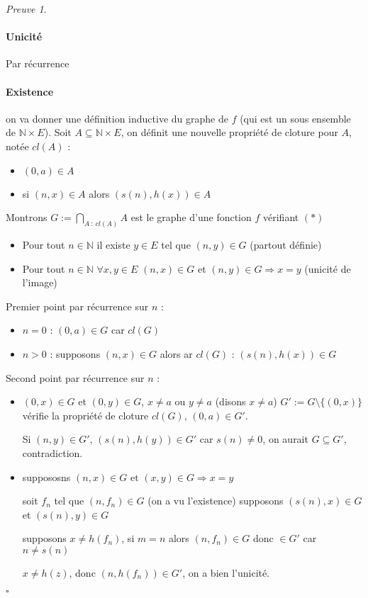 \documentclass[]{article}
\theoremstyle{remark}
\newtheorem{myproof}{Preuve}
\theoremstyle{definition}
\newcommand{\cqfd}{
	\hfill$\square$
}
\begin{document}
\begin{myproof}
	\leavevmode
	\paragraph{Unicité}
	Par récurrence \checkmark
	\paragraph{Existence}
	on va donner une définition inductive du graphe de $f$ (qui est un sous ensemble de $\mathbb{N} \times E$).
	Soit $A \subseteq \mathbb{N} \times E$, on définit une nouvelle propriété de cloture pour $A$, notée $cl(A)$ :
	\begin{itemize}
		\item $(0, a) \in A$
		\item si $(n, x) \in A$ alors $(s(n), h(x)) \in A$
	\end{itemize}
	
	Montrons $G := \bigcap_{A ~ : ~ cl(A)} A$ est le graphe d'une fonction $f$ vérifiant $(*)$
	
	\begin{itemize}
		\item Pour tout $n \in \mathbb{N}$ il existe $y \in E$ tel que $(n, y) \in G$ (partout définie)
		\item Pour tout $n \in \mathbb{N}$ $\forall x, y \in E$ $(n, x) \in G$ et $(n ,y) \in G \Longrightarrow x = y$ (unicité de l'image)
	\end{itemize}
	
	Premier point par récurrence sur $n$ :
	\begin{itemize}
		\item $n=0$ : $(0, a) \in G$ car $cl(G)$
		\item $n > 0$ : supposons $(n, x) \in G$ alors ar $cl(G)$ : $(s(n), h(x)) \in G$
	\end{itemize}
	
	Second point par récurrence sur $n$ :
	\begin{itemize}
		\item $(0, x) \in G$ et $(0, y) \in G$, $x \neq a$ ou $y \neq a$ (disons $x \neq a$)
		$G' := G \setminus \{(0, x)\}$ vérifie la propriété de cloture $cl(G)$, $(0, a) \in G'$.
		
		Si $(n, y) \in G'$, $(s(n), h(y)) \in G'$ car $s(n) \neq 0$, on aurait $G \subseteq G'$, contradiction.
		
		\item suppososns $(n, x) \in G \text{ et } (x, y) \in G \Longrightarrow x = y$
		
		soit $f_n$ tel que $(n, f_n) \in G$ (on a vu l'existence) supposons $(s(n), x) \in G$ et $(s(n), y) \in G$
		
		supposons $x \neq h(f_n)$, si $m = n$ alors $(n, f_n) \in G$ donc $\in G'$ car $n \neq s(n)$
		
		$x \neq h(z)$, donc $(n, h(f_n)) \in G'$, on a bien l'unicité.
	\end{itemize}
	\cqfd
\end{myproof}
\end{document}
